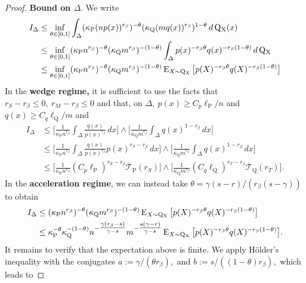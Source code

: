 \documentclass[10pt]{article}
\newcommand{\mT}{\mathcal{T}}
\newcommand{\E}{\operatorname{E}}
\renewcommand{\P}{\operatorname{P}}
\newcommand{\Q}{\operatorname{Q}}
\renewcommand{\k}{\kappa}
\newcommand{\sX}{\mathrm{X}}
\begin{document}
\begin{proof}
    \noindent\textbf{Bound on $\Delta.$}
    We write
    \begin{align*}
        I_{\Delta} &\leq \inf_{\theta \in [0, 1]}\int_{\Delta}(\k_{\P}(np(x))^{r_\beta})^{-\theta}(\k_{\Q}(mq(x))^{r_\beta})^{1 - \theta}\, d\Q\mathstrut_{\!\sX}(x)\\
        &\leq \inf_{\theta \in [0, 1]}(\k_{\P}n^{r_\beta})^{-\theta}(\k_{\Q}m^{r_\beta})^{-(1 - \theta)}\int_{\Delta}p(x)^{-r_\beta \theta}q(x)^{-r_\beta(1 - \theta)}\, d\Q\mathstrut_{\!\sX}\\
        &\leq \inf_{\theta \in [0, 1]}(\k_{\P}n^{r_\beta})^{-\theta}(\k_{\Q}m^{r_\beta})^{-(1 - \theta)}\E_{X \sim \Q\mathstrut_{\!\sX}}\big[p(X)^{-r_\beta \theta}q(X)^{-r_\beta(1 - \theta)}\big]
    \end{align*}
    In the \textbf{wedge regime,} it is sufficient to use the facts that $r_S - r_\beta \leq 0, \ r_M - r_\beta \leq 0$ and that, on $\Delta, \ p(x) \geq C_p\ell_{\P}/n$ and $q(x) \geq C_q \ell_{\Q}/m$ and 
    \begin{align*}
        I_{\Delta} &\leq \bigg[\frac{1}{\k_{\P}n^{r_\beta}}\int_{\Delta}\frac{q(x)}{p(x)^{r_\beta}}\, dx\bigg]\wedge \bigg[\frac{1}{\k_{\Q}m^{r_\beta}}\int_{\Delta}q(x)^{1 - r_\beta}\, dx\bigg]\\
        &\leq \bigg[\frac{1}{\k_{\P}n^{r_\beta}}\int_{\Delta}\frac{q(x)}{p(x)^{r_S}}p(x)^{r_S - r_\beta}\, dx\bigg]\wedge \bigg[\frac{1}{\k_{\Q}m^{r_\beta}}\int_{\Delta}q(x)^{1 - r_\beta}\, dx\bigg]\\
        &\leq \bigg[\frac{1}{\k_{\P}n^{r_S}}(C_p\ell_{\P})^{r_S - r_\beta}\mT_{\P}(r_S)\bigg]\wedge\bigg[\frac{1}{\k_{\Q}m^{r_T}}(C_q\ell_{\Q})^{r_T - r_\beta}\mT_{\Q}(r_T)\bigg].
    \end{align*}
    In the \textbf{acceleration regime}, we can instead take $\theta = \gamma(s - r)/(r_\beta(s - \gamma))$ to obtain
    \begin{align*}
        I_{\Delta} &\leq (\k_{\P}n^{r_\beta})^{-\theta}(\k_{\Q}m^{r_\beta})^{-(1 - \theta)}\E_{X \sim \Q\mathstrut_{\!\sX}}\big[p(X)^{-r_\beta \theta}q(X)^{-r_\beta(1 - \theta)}\big]\\
        &\leq \k_{\P}^{-\theta}\k_{\Q}^{-(1 - \theta)}n^{-\tfrac{\gamma(r_\beta - s)}{\gamma - s}}m^{-\tfrac{s(\gamma - r)}{\gamma - s}}\E_{X \sim \Q\mathstrut_{\!\sX}}\big[p(X)^{-r_\beta \theta}q(X)^{-r_\beta(1 - \theta)}\big].
    \end{align*}
    It remains to verify that the expectation above is finite. We apply H\"older's inequality with the conjugates $a := \gamma/(\theta r_\beta),$ and $b := s/((1 - \theta)r_\beta),$ which leads to

\end{proof}
\end{document}
